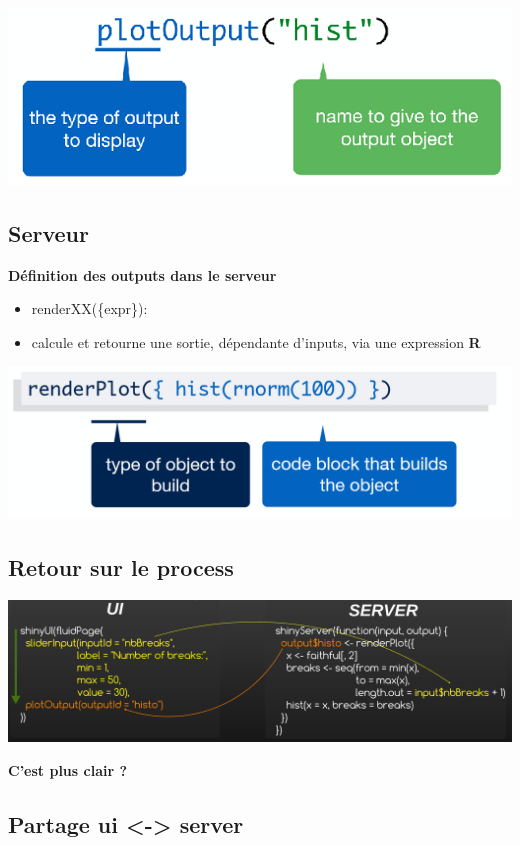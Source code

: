 \documentclass[]{article}
\begin{document}
\includegraphics{img/xxOutput.png}

\subsection{Serveur}\label{serveur}

\textbf{Définition des outputs dans le serveur}

\begin{itemize}
\item
  renderXX(\{expr\}):
\item
  calcule et retourne une sortie, dépendante d'inputs, via une
  expression \textbf{R}
\end{itemize}

\includegraphics{img/renderXX.png}

\subsection{Retour sur le process}\label{retour-sur-le-process}

\includegraphics{img/shiny_process.png}

\textbf{C'est plus clair ?}

\subsection{Partage ui \textless{}-\textgreater{}
server}\label{partage-ui---server}
\end{document}
